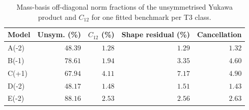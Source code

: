 \begin{table}[htbp]
\centering
\caption{Mass-basis off-diagonal norm fractions of the unsymmetrised Yukawa product and $C_{12}$ for one fitted benchmark per T3 class.}
\label{tab:t3-flavour-alignment}
\begin{tabular}{lrrrr}
\toprule
Model & Unsym. (\%) & $C_{12}$ (\%) & Shape residual (\%) & Cancellation \\
\midrule
A(-2) & $48.39$ & $1.28$ & $1.29$ & $1.32$ \\
B(-1) & $78.61$ & $1.94$ & $3.35$ & $4.60$ \\
C(+1) & $67.94$ & $4.11$ & $7.17$ & $4.90$ \\
D(-2) & $48.17$ & $1.48$ & $1.51$ & $1.43$ \\
E(-2) & $88.16$ & $2.53$ & $2.56$ & $2.63$ \\
\bottomrule
\end{tabular}
\end{table}

